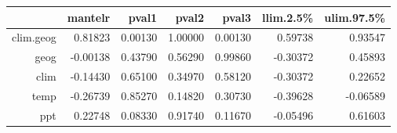 \begin{table}[ht]
\centering
\begin{tabular}{rrrrrrr}
  \hline
 & mantelr & pval1 & pval2 & pval3 & llim.2.5\% & ulim.97.5\% \\ 
  \hline
clim.geog & 0.81823 & 0.00130 & 1.00000 & 0.00130 & 0.59738 & 0.93547 \\ 
  geog & -0.00138 & 0.43790 & 0.56290 & 0.99860 & -0.30372 & 0.45893 \\ 
  clim & -0.14430 & 0.65100 & 0.34970 & 0.58120 & -0.30372 & 0.22652 \\ 
  temp & -0.26739 & 0.85270 & 0.14820 & 0.30730 & -0.39628 & -0.06589 \\ 
  ppt & 0.22748 & 0.08330 & 0.91740 & 0.11670 & -0.05496 & 0.61603 \\ 
   \hline
\end{tabular}
\end{table}
